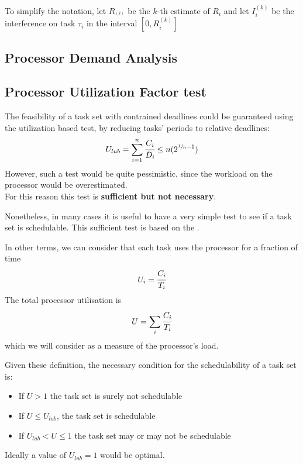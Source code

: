 To simplify the notation, let $R_^{(k)}$ be the $k$-th estimate of $R_i$ and let $I_i^{(k)}$ be the interference on task $\tau_i$ in the interval $[0, R_i^{(k)}]$


\subsection{Processor Demand Analysis}

\subsection{Processor Utilization Factor test}
The feasibility of a task set with contrained deadlines could be guaranteed using the utilization based test, by reducing tasks' periods to relative deadlines:
\[U_{lub} = \sum_{i=1}^n \cfrac{C_i}{D_i} \le n(2^{\sfrac{1}{n}-1})\]
However, such a test would be quite pessimistic, since the workload on the processor would be overestimated.\\
For this reason this test is \textbf{sufficient but not necessary}.

Nonetheless, in many cases it is useful to have a very simple test to see if a task set is schedulable.
This sufficient test is based on the .

In other terms, we can consider that each task uses the processor for a fraction of time 
\[U_i = \cfrac{C_i}{T_i}\]
The total processor utilisation is
\[U = \sum_i \cfrac{C_i}{T_i}\]
which we will consider as a measure of the processor's load.

Given these definition, the necessary condition for the schedulability of a task set is:
\begin{itemize}
    \item If $U>1$ the task set is surely not schedulable
    \item If $U\le U_{lub}$, the task set is schedulable
    \item If $U_{lub}<U \le 1$ the task set may or may not be schedulable
\end{itemize}
Ideally a value of $U_{lub} = 1$ would be optimal.

